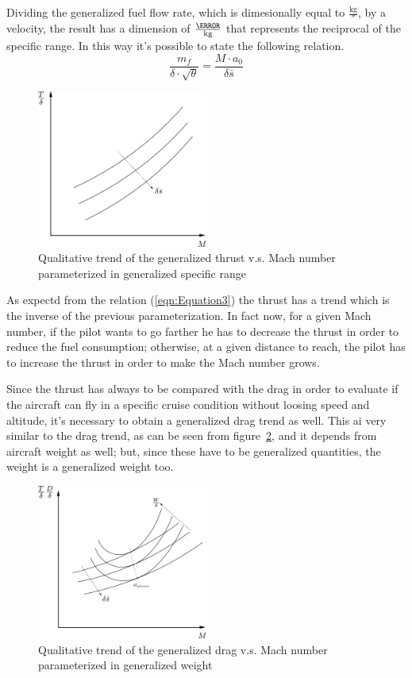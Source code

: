 \bigskip
\noindent
Dividing the generalized fuel flow rate, which is dimesionally equal to $\frac{\si{\kilogram}}{\second}$, by a velocity, the result has a dimension of $\frac{\meter}{\si{\kilogram}}$ that represents the reciprocal of the specific range. In this way it's possible to state the following relation.
%
\begin{equation}
\frac{m_{f}}{\delta \cdot \sqrt{\theta}}=\frac{M\cdot a_{0}}{\delta\bar s}
\label{eqn:Equation3}
\end{equation}
%
\begin{figure}[!ht]
\centering
\includegraphics[keepaspectratio, width=0.50\textwidth]{TDelta_SpecificRange}
\caption{Qualitative trend of the generalized thrust v.s. Mach number parameterized in generalized specific range}
\label{fig:Figure2}
\end{figure}
%
\noindent
As expectd from the relation (\ref{eqn:Equation3}) the thrust has a trend which is the inverse of the previous parameterization. In fact now, for a given Mach number, if the pilot wants to go farther he has to decrease the thrust in order to reduce the fuel consumption; otherwise, at a given distance to reach, the pilot has to increase the thrust in order to make the Mach number grows.

\bigskip
\noindent
Since the thrust has always to be compared with the drag in order to evaluate if the aircraft can fly in a specific cruise condition without loosing speed and altitude, it's necessary to obtain a generalized drag trend as well. 
%
This ai very similar to the drag trend, as can be seen from figure~\ref{fig:Figure3}, and it depends from aircraft weight as well; but, since these have to be generalized quantities, the weight is a generalized weight too.
%
\begin{figure}[b]
\centering
\includegraphics[keepaspectratio, width=0.50\textwidth]{DragDelta_SpecificRange}
\caption{Qualitative trend of the generalized drag v.s. Mach number parameterized in generalized weight}
\label{fig:Figure3}
\end{figure}

